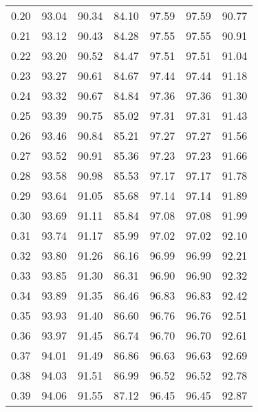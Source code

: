 \begin{tabular}{|c|c|c|c|c|c|c|}
      0.20 &     93.04 &     90.34 &      84.10 &   97.59 &      97.59 &         90.77 \\
      0.21 &     93.12 &     90.43 &      84.28 &   97.55 &      97.55 &         90.91 \\
      0.22 &     93.20 &     90.52 &      84.47 &   97.51 &      97.51 &         91.04 \\
      0.23 &     93.27 &     90.61 &      84.67 &   97.44 &      97.44 &         91.18 \\
      0.24 &     93.32 &     90.67 &      84.84 &   97.36 &      97.36 &         91.30 \\
      0.25 &     93.39 &     90.75 &      85.02 &   97.31 &      97.31 &         91.43 \\
      0.26 &     93.46 &     90.84 &      85.21 &   97.27 &      97.27 &         91.56 \\
      0.27 &     93.52 &     90.91 &      85.36 &   97.23 &      97.23 &         91.66 \\
      0.28 &     93.58 &     90.98 &      85.53 &   97.17 &      97.17 &         91.78 \\
      0.29 &     93.64 &     91.05 &      85.68 &   97.14 &      97.14 &         91.89 \\
      0.30 &     93.69 &     91.11 &      85.84 &   97.08 &      97.08 &         91.99 \\
      0.31 &     93.74 &     91.17 &      85.99 &   97.02 &      97.02 &         92.10 \\
      0.32 &     93.80 &     91.26 &      86.16 &   96.99 &      96.99 &         92.21 \\
      0.33 &     93.85 &     91.30 &      86.31 &   96.90 &      96.90 &         92.32 \\
      0.34 &     93.89 &     91.35 &      86.46 &   96.83 &      96.83 &         92.42 \\
      0.35 &     93.93 &     91.40 &      86.60 &   96.76 &      96.76 &         92.51 \\
      0.36 &     93.97 &     91.45 &      86.74 &   96.70 &      96.70 &         92.61 \\
      0.37 &     94.01 &     91.49 &      86.86 &   96.63 &      96.63 &         92.69 \\
      0.38 &     94.03 &     91.51 &      86.99 &   96.52 &      96.52 &         92.78 \\
      0.39 &     94.06 &     91.55 &      87.12 &   96.45 &      96.45 &         92.87 \\

\end{tabular}
